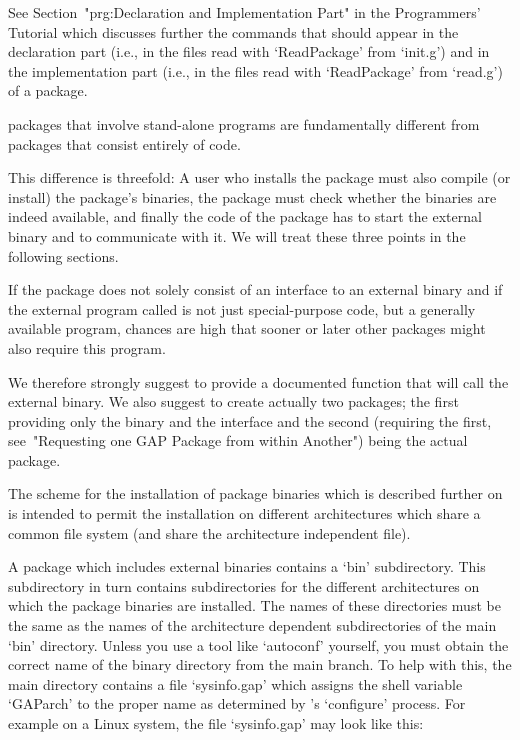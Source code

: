See Section~"prg:Declaration and Implementation Part" in the Programmers'
Tutorial which discusses further the commands that should appear in the
declaration part (i.e., in the files read with `ReadPackage' from `init.g')
and in the implementation part (i.e., in the files read with `ReadPackage'
from `read.g') of a package.


{\GAP} packages that  involve stand-alone programs are fundamentally
different from {\GAP} packages that consist entirely of {\GAP} code.

This difference is threefold: A  user who installs the {\GAP} package
must also  compile (or install) the package's  binaries, the
package must  check whether the binaries  are indeed available,
and finally the {\GAP} code of the package has to start the external
binary and to communicate with it.
We will treat these three points in the following sections.

If the package does not solely consist of an interface to an external
binary and if the external program called is not just special-purpose
code, but a generally available program, chances are high that sooner
or later other {\GAP} packages might also require this program.

We therefore strongly suggest to provide a documented {\GAP} function
that will call the external binary. We also suggest to create actually
two {\GAP}  packages; the first providing only the binary and the
interface and the second (requiring the first, see~"Requesting one
GAP Package from within Another") being the actual {\GAP} package.



The scheme for the installation of package binaries which is described
further on is intended to permit  the installation on different
architectures which  share a common file  system (and share the
architecture independent file).

A {\GAP} package  which includes external binaries contains a `bin'
subdirectory. This subdirectory in turn contains subdirectories for
the different architectures on which the {\GAP} package binaries are
installed.  The names of these directories must be the same as the
names of the architecture dependent subdirectories of the main `bin'
directory. Unless you use a tool like `autoconf' yourself, you must
obtain the correct name of the binary directory from the main {\GAP}
branch. To help with this, the main {\GAP} directory contains a file
`sysinfo.gap' which assigns the shell variable `GAParch' to the proper
name as determined by {\GAP}'s `configure' process. For example on a
Linux system, the file `sysinfo.gap' may  look like this:

